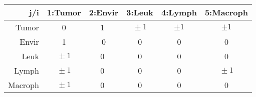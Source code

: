 \documentclass{standalone}
\begin{document}
\begin{tabular}{r c c c c c}
	\toprule
	‎j/i 		& 1:Tumor & 2:Envir & 3:Leuk & 4:Lymph & 5:Macroph \\
	\midrule
	Tumor 	& 0 		  & 1 ‎& \(‎\pm1\) & \(\pm1\) & \(\pm1\)\\
	Envir 	& 1 		  & 0 & 0		  & 0 		     & 0\\
	Leuk 	& \(‎\pm1\) & ‎0 ‎& 0‎ 		  & 0 		     & 0 \\
	Lymph	& \(‎\pm1\) & ‎0 ‎& 0‎ 		  & 0 		     &  \(‎\pm1\)  \\
	Macroph 	& \(‎\pm1\) & ‎0 ‎& 0‎ 		  & 0 		     & 0 \\
	\bottomrule
\end{tabular}
\end{document}

